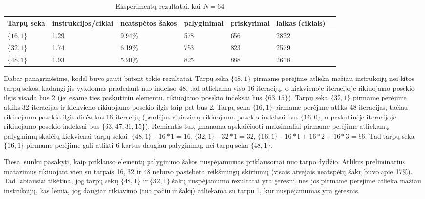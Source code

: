 \documentclass{VUMIFInfBakalaurinis}
\begin{document}
\begin{table}[H]
  \caption{Eksperimentų rezultatai, kai $N = 64$}
  \label{perf_results2_64}
  \centering
  \begin{tabular}{@{}lllllll@{}}
  Tarpų seka             & instrukcijos/ciklai     & neatspėtos šakos  & palyginimai       & priskyrimai      & laikas (ciklais) \\ \midrule
  $\{16, 1\}$            & 1.29                    & 9.94\%            & 578               & 656              & 2822                  \\
  $\{32, 1\}$            & 1.74                    & 6.19\%            & 753               & 823              & 2579                  \\
  $\{48, 1\}$            & 1.93                    & 5.20\%            & 825               & 888              & 2618                  \\ \bottomrule
  \end{tabular}
\end{table}

Dabar panagrinėsime, kodėl buvo gauti būtent tokie rezultatai.
Tarpų seka $\{48, 1\}$ pirmame perėjime atlieka mažiau instrukcijų nei kitos tarpų sekos, kadangi jis vykdomas pradedant nuo indekso $48$,
tad atliekama viso 16 iteracijų, o kiekvienoje iteracijoje rikiuojamo posekio ilgis visada bus 2 (jei esame ties paskutiniu elementu, rikiuojamo posekio indeksai bus $\{63, 15\}$).
Tarpų seka $\{32, 1\}$ pirmame perėjime atliks 32 iteracijas ir kiekvieno rikiuojamo posekio ilgis taip pat bus 2.
Tarpų seka $\{16, 1\}$ pirmame perėjime atliks 48 iteracijas, tačiau rikiuojamo posekio ilgis didės kas 16 iteracijų (pradėjus rikiavimą
rikiuojamo posekio indeksai bus $\{16, 0\}$, o paskutinėje iteracijoje rikiuojamo posekio indeksai bus $\{63, 47, 31, 15\}$).
Remiantis tuo, įmanoma apskaičiuoti maksimaliai pirmame perėjime atliekamų palyginimų skaičių kiekvienai tarpų sekai:
$\{48, 1\}$ - $16 * 1 = 16$, $\{32, 1\}$ - $32 * 1 = 32$, $\{16, 1\}$ - $16 * 1 + 16 * 2 + 16 * 3 = 96$.
Tad tarpų seka $\{16, 1\}$ pirmame perėjime gali atlikti 6 kartus daugiau palyginimų, nei tarpų seka $\{48, 1\}$.

Tiesa, sunku pasakyti, kaip priklauso elementų palyginimo šakos nuspėjamumas priklausomai nuo tarpo dydžio.
Atlikus preliminarius matavimus rikiuojant vien su tarpais 16, 32 ir 48 nebuvo pastebėta reikšmingų skirtumų (visais atvejais neatspėtų šakų buvo apie 17\%).
Tad labiausiai tikėtina, jog tarpų sekų $\{48, 1\}$ ir $\{32, 1\}$ šakų nuspėjamumo rezultatai yra geresni, nes jos pirmame perėjime
atlieka mažiau instrukcijų, kas lemia, jog daugiau rikiavimo (tuo pačiu ir šakų) atliekama su tarpu 1, kur nuspėjamumas yra geresnis.
\end{document}
